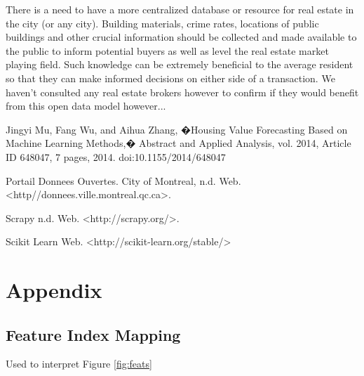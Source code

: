 \documentclass{acm_proc_article-sp}
\begin{document}
	There is a need to have a more centralized database or resource for real estate in the city (or any city). Building materials, crime rates, locations of public buildings and other crucial information should be collected and made available to the public to inform potential buyers as well as level the real estate market playing field. Such knowledge can be extremely beneficial to the average resident so that they can make informed decisions on either side of a transaction. We haven't consulted any real estate brokers however to confirm if they would benefit from this open data model however...

\begin{thebibliography}{9}

  Jingyi Mu, Fang Wu, and Aihua Zhang, �Housing Value Forecasting Based on Machine Learning Methods,� Abstract and Applied Analysis, vol. 2014, Article ID 648047, 7 pages, 2014. doi:10.1155/2014/648047
  
	Portail Donnees Ouvertes. City of Montreal, n.d. Web. <http//donnees.ville.montreal.qc.ca>.
	
	Scrapy n.d. Web. <http://scrapy.org/>.
	
 	Scikit Learn Web. <http://scikit-learn.org/stable/>

\end{thebibliography}

\section{Appendix}
\subsection{Feature Index Mapping}
Used to interpret Figure \ref{fig:feats} \\
\end{document}
